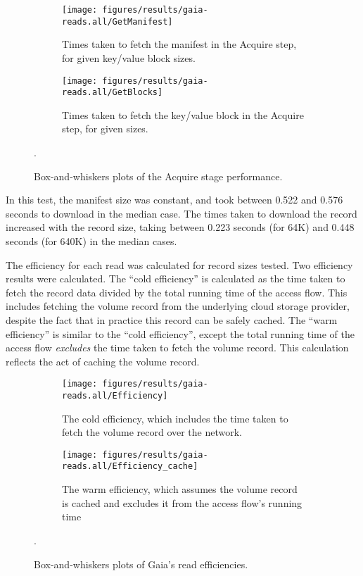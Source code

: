 \begin{figure}[htp!]
   \centering
   \begin{subfigure}[b]{.8\textwidth}
      \texttt{[image: figures/results/gaia-reads.all/GetManifest]}
      \label{fig:gaia-read-getmanifest}
      \caption{Times taken to fetch the manifest in the Acquire step, for given
      key/value block sizes.}
   \end{subfigure}
   \begin{subfigure}[b]{.8\textwidth}
      \texttt{[image: figures/results/gaia-reads.all/GetBlocks]}
      \label{fig:gaia-read-discover}
      \caption{Times taken to fetch the key/value block in the Acquire step, for
      given sizes.}
   \end{subfigure}
   \caption{Box-and-whiskers plots of the Acquire stage performance.}
   \label{fig:gaia-acquire-breakdown}.
\end{figure}

In this test, the manifest size was constant, and took between 0.522 and 0.576 
seconds to download in the median case.  The times taken to download the record
increased with the record size, taking between 0.223 seconds (for 64K) and 0.448
seconds (for 640K) in the median cases.

The efficiency for each read was calculated for record sizes tested.  Two
efficiency results were calculated.  The ``cold efficiency'' is calculated as
the time taken to fetch the record data
divided by the total running time of the access flow.  This includes fetching
the volume record from the underlying cloud storage provider, despite the fact
that in practice this record can be safely cached.  The ``warm efficiency'' is
similar to the ``cold efficiency'', except the total running time of the access
flow \emph{excludes} the time taken to fetch the volume record.  This
calculation reflects the act of caching the volume record.

\begin{figure}[htp!]
   \centering
   \begin{subfigure}[b]{.8\textwidth}
      \texttt{[image: figures/results/gaia-reads.all/Efficiency]}
      \label{fig:gaia-read-getmanifest}
      \caption{The cold efficiency, which includes the time taken to fetch the
      volume record over the network.}
   \end{subfigure}
   \begin{subfigure}[b]{.8\textwidth}
      \texttt{[image: figures/results/gaia-reads.all/Efficiency\_cache]}
      \label{fig:gaia-read-discover}
      \caption{The warm efficiency, which assumes the volume record is cached
      and excludes it from the access flow's running time}
   \end{subfigure}
   \caption{Box-and-whiskers plots of Gaia's read efficiencies.}
   \label{fig:gaia-read-efficiencies}.
\end{figure}


